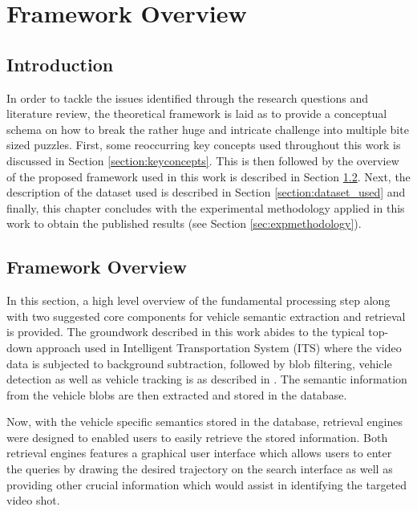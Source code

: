 \chapter{Framework Overview}

\section{Introduction}
In order to tackle the issues identified through the research questions and literature review, the theoretical framework is laid as to provide a conceptual schema on how to break the rather huge and intricate challenge into multiple bite sized puzzles. First, some reoccurring key concepts used throughout this work is discussed in Section \ref{section:keyconcepts}. This is then followed by the overview of the proposed framework used in this work is described in Section \ref{section:framework}. Next, the description of the dataset used is described in Section \ref{section:dataset_used} and finally, this chapter concludes with the experimental methodology applied in this work to obtain the published results (see Section \ref{sec:expmethodology}). 



\section{Framework Overview}
\label{section:framework}
In this section, a high level overview of the fundamental processing step along with two suggested core components for vehicle semantic extraction and retrieval is provided. The groundwork described in this work abides to the typical top-down approach used in Intelligent Transportation System (ITS) where the video data is subjected to background subtraction, followed by blob filtering, vehicle detection as well as vehicle tracking is as described in \cite{lim2017}. The semantic information from the vehicle blobs are then extracted and stored in the database. 

Now, with the vehicle specific semantics stored in the database, retrieval engines were designed to enabled users to easily retrieve the stored information. Both retrieval engines features a graphical user interface which allows users to enter the queries by drawing the desired trajectory on the search interface as well as providing other crucial information which would assist in identifying the targeted video shot.


